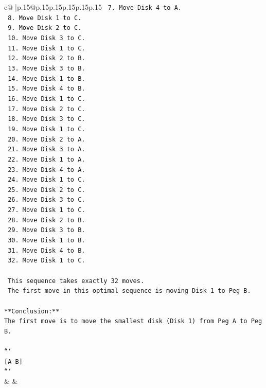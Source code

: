 \documentclass{article}
\begin{document}
{\begin{supertabular}{c@{$\;$}|p{.15\linewidth}@{}p{.15\linewidth}p{.15\linewidth}p{.15\linewidth}p{.15\linewidth}p{.15\linewidth}}
{{{\texttt{    7.  Move Disk 4 to A.} \\
\texttt{    8.  Move Disk 1 to C.} \\
\texttt{    9.  Move Disk 2 to C.} \\
\texttt{    10. Move Disk 3 to C.} \\
\texttt{    11. Move Disk 1 to C.} \\
\texttt{    12. Move Disk 2 to B.} \\
\texttt{    13. Move Disk 3 to B.} \\
\texttt{    14. Move Disk 1 to B.} \\
\texttt{    15. Move Disk 4 to B.} \\
\texttt{    16. Move Disk 1 to C.} \\
\texttt{    17. Move Disk 2 to C.} \\
\texttt{    18. Move Disk 3 to C.} \\
\texttt{    19. Move Disk 1 to C.} \\
\texttt{    20. Move Disk 2 to A.} \\
\texttt{    21. Move Disk 3 to A.} \\
\texttt{    22. Move Disk 1 to A.} \\
\texttt{    23. Move Disk 4 to A.} \\
\texttt{    24. Move Disk 1 to C.} \\
\texttt{    25. Move Disk 2 to C.} \\
\texttt{    26. Move Disk 3 to C.} \\
\texttt{    27. Move Disk 1 to C.} \\
\texttt{    28. Move Disk 2 to B.} \\
\texttt{    29. Move Disk 3 to B.} \\
\texttt{    30. Move Disk 1 to B.} \\
\texttt{    31. Move Disk 4 to B.} \\
\texttt{    32. Move Disk 1 to C.} \\
\\ 
\texttt{    This sequence takes exactly 32 moves.} \\
\texttt{    The first move in this optimal sequence is moving Disk 1 to Peg B.} \\
\\ 
\texttt{**Conclusion:**} \\
\texttt{The first move is to move the smallest disk (Disk 1) from Peg A to Peg B.} \\
\\ 
\texttt{```} \\
\texttt{{[}A B{]}} \\
\texttt{```} \\
            }
        }
    }
    & & \\ \\


\end{supertabular}}
\end{document}
